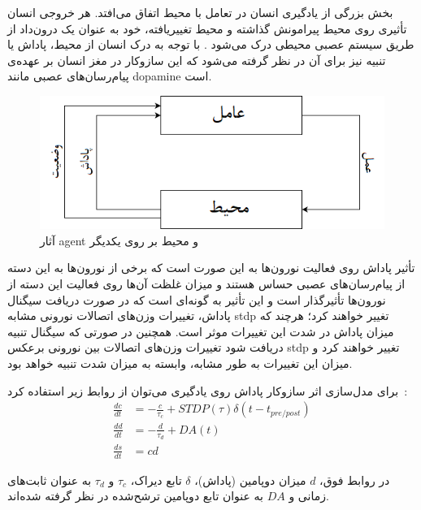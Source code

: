 \documentclass[12pt]{report}
\begin{document}
بخش بزرگی از یادگیری انسان در تعامل با محیط اتفاق می‌افتد. هر خروجی انسان تأثیری روی محیط پیرامونش گذاشته و محیط تغییر‌یافته، خود به عنوان یک درون‌داد از طریق سیستم عصبی محیطی درک می‌شود
\cite{sutton1998reinforcement}.
با توجه به درک انسان از محیط، پاداش یا تنبیه نیز برای آن در نظر گرفته می‌شود که این ساز‌و‌کار در مغز انسان بر عهده‌ی پیام‌رسان‌های عصبی  مانند \gls{dopamine} است. 

\begin{figure}[H]
	\centering
	\includegraphics[width=0.7\linewidth]{rl.png}
	\caption[NS]{
		آثار \gls{agent} و محیط بر روی یکدیگر
	}
	\label{fig:rl}
\end{figure}

تأثیر پاداش روی فعالیت نورون‌ها به این صورت است که برخی از نورون‌ها به این دسته از پیام‌رسان‌‌های عصبی حساس هستند و میزان غلظت آن‌ها روی فعالیت این دسته از نورون‌ها تأثیر‌گذار است و این تأثیر به گونه‌ای است که در صورت دریافت سیگنال پاداش، تغییرات وزن‌های اتصالات نورونی مشابه \gls{stdp} تغییر خواهند کرد؛ هرچند که میزان پاداش در شدت این تغییرات موثر است. همچنین در صورتی که سیگنال تنبیه دریافت شود تغییرات وزن‌های اتصالات بین نورونی برعکس \gls{stdp} تغییر خواهند کرد و میزان این تغییرات به طور مشابه، وابسته به میزان شدت تنبیه خواهد بود.

برای مدل‌سازی اثر سازوکار پاداش روی یادگیری می‌توان از روابط زیر استفاده کرد~\cite{gerstner2014neuronal}:  
\begin{subequations}
	\begin{align}
		\frac{dc}{dt} &= -\frac{c}{\tau_c} + STDP(\tau) \delta(t-t_{pre/post}) \label{eq:rstdp1}\\
		\frac{dd}{dt} &= -\frac{d}{\tau_d} + DA(t) \label{eq:rstdp2}\\
		\frac{ds}{dt} &= cd
		\label{eq:rstdp3}
	\end{align}
\end{subequations}

در روابط فوق، $d$ میزان دوپامین (پاداش)، $\delta$ تابع دیراک، $\tau_c$ و $\tau_d$ به عنوان ثابت‌های زمانی و $DA$ به عنوان تابع دوپامین ترشح‌شده در نظر گرفته‌ شده‌اند.
\end{document}
